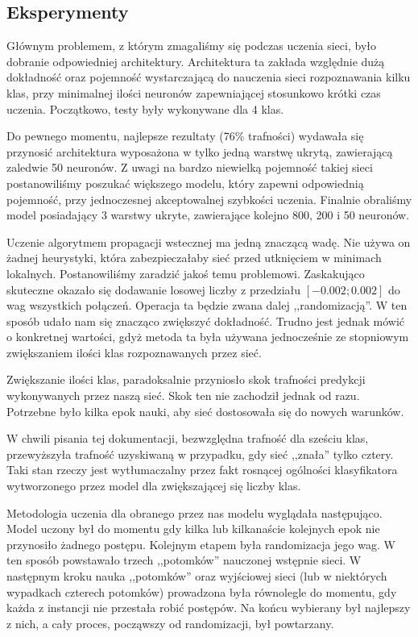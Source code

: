 \documentclass[12pt,a4paper]{article}
\begin{document}
	\subsection*{Eksperymenty}
    \hspace{14pt} Głównym problemem, z którym zmagaliśmy się podczas uczenia sieci, było dobranie odpowiedniej architektury. Architektura ta zakłada względnie dużą dokładność oraz pojemność wystarczającą do nauczenia sieci rozpoznawania kilku klas, przy minimalnej ilości neuronów zapewniającej stosunkowo krótki czas uczenia. Początkowo, testy były wykonywane dla 4 klas. \par Do pewnego momentu, najlepsze rezultaty (76\% trafności) wydawała się przynosić architektura wyposażona w tylko jedną warstwę ukrytą, zawierającą zaledwie 50 neuronów. Z uwagi na bardzo niewielką pojemność takiej sieci postanowiliśmy poszukać większego modelu, który zapewni odpowiednią pojemność, przy jednoczesnej akceptowalnej szybkości uczenia. Finalnie obraliśmy model posiadający 3 warstwy ukryte, zawierające kolejno 800, 200 i 50 neuronów.
    \par Uczenie algorytmem propagacji wstecznej ma jedną znaczącą wadę. Nie używa on żadnej heurystyki, która zabezpieczałaby sieć przed utknięciem w minimach lokalnych. Postanowiliśmy zaradzić jakoś temu problemowi. Zaskakująco skuteczne okazało się dodawanie losowej liczby z przedziału $[-0.002;0.002]$ do wag wszystkich połączeń. Operacja ta będzie zwana dalej ,,randomizacją''. W ten sposób udało nam się znacząco zwiększyć dokładność. Trudno jest jednak mówić o konkretnej wartości, gdyż metoda ta była używana jednocześnie ze stopniowym zwiększaniem ilości klas rozpoznawanych przez sieć.
    \par Zwiększanie ilości klas, paradoksalnie przyniosło skok trafności predykcji wykonywanych przez naszą sieć. Skok ten nie zachodził jednak od razu. Potrzebne było kilka epok nauki, aby sieć dostosowała się do nowych warunków.
    \par W chwili pisania tej dokumentacji, bezwzględna trafność dla sześciu klas, przewyższyła trafność uzyskiwaną w przypadku, gdy sieć ,,znała'' tylko cztery. Taki stan rzeczy jest wytłumaczalny przez fakt rosnącej ogólności klasyfikatora wytworzonego przez model dla zwiększającej się liczby klas.
    \par Metodologia uczenia dla obranego przez nas modelu wyglądała następująco. Model uczony był do momentu gdy kilka lub kilkanaście kolejnych epok nie przynosiło żadnego postępu. Kolejnym etapem była randomizacja jego wag. W ten sposób powstawało trzech ,,potomków'' nauczonej wstępnie sieci. W następnym kroku nauka ,,potomków'' oraz wyjściowej sieci (lub w niektórych wypadkach czterech potomków) prowadzona była równolegle do momentu, gdy każda z instancji nie przestała robić postępów. Na końcu wybierany był najlepszy z nich, a cały proces, począwszy od randomizacji, był powtarzany.
\end{document}
